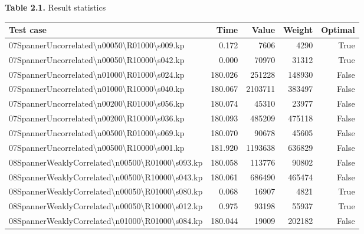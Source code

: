 \documentclass[english, a4paper,12pt]{article}
\begin{document}
\begin{center}
\textbf{Table 2.1.} Result statistics
\end{center}
\newpage
\small\begin{tabularx}{0.95\textwidth}{|>{\raggedright\arraybackslash}Xrrrr|}
\hline
\textbf{Test case} & \textbf{Time} & \textbf{Value} & \textbf{Weight} & \textbf{Optimal} \\
\hline
\addlinespace
\hline
07SpannerUncorrelated\textbackslash n00050\textbackslash R01000\textbackslash s009.kp & 0.172 & 7606 & 4290 & True \\
07SpannerUncorrelated\textbackslash n00050\textbackslash R10000\textbackslash s042.kp & 0.000 & 70970 & 31312 & True \\
07SpannerUncorrelated\textbackslash n01000\textbackslash R01000\textbackslash s024.kp & 180.026 & 251228 & 148930 & False \\
07SpannerUncorrelated\textbackslash n01000\textbackslash R10000\textbackslash s040.kp & 180.067 & 2103711 & 383497 & False \\
07SpannerUncorrelated\textbackslash n00200\textbackslash R01000\textbackslash s056.kp & 180.074 & 45310 & 23977 & False \\
07SpannerUncorrelated\textbackslash n00200\textbackslash R10000\textbackslash s036.kp & 180.093 & 485209 & 475118 & False \\
07SpannerUncorrelated\textbackslash n00500\textbackslash R01000\textbackslash s069.kp & 180.070 & 90678 & 45605 & False \\
07SpannerUncorrelated\textbackslash n00500\textbackslash R10000\textbackslash s001.kp & 181.920 & 1193638 & 636829 & False \\
\hline
\addlinespace
\hline
08SpannerWeaklyCorrelated\textbackslash n00500\textbackslash R01000\textbackslash s093.kp & 180.058 & 113776 & 90802 & False \\
08SpannerWeaklyCorrelated\textbackslash n00500\textbackslash R10000\textbackslash s043.kp & 180.061 & 686490 & 465474 & False \\
08SpannerWeaklyCorrelated\textbackslash n00050\textbackslash R01000\textbackslash s080.kp & 0.068 & 16907 & 4821 & True \\
08SpannerWeaklyCorrelated\textbackslash n00050\textbackslash R10000\textbackslash s012.kp & 0.975 & 93198 & 55937 & True \\
08SpannerWeaklyCorrelated\textbackslash n01000\textbackslash R01000\textbackslash s084.kp & 180.044 & 19009 & 202182 & False \\

\end{tabularx}
\end{document}
